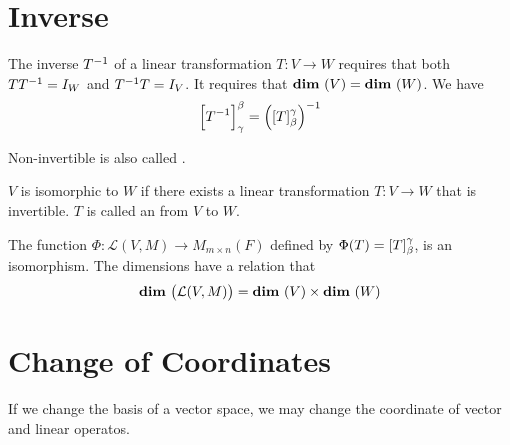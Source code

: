 %
%
%
%


\section{Inverse}
\begin{definition}
    The inverse ${T}^{-1}$ of a linear transformation $T:V \rightarrow W$ requires that both $T {T}^{-1} = I_W$ and ${T}^{-1} T = I_V$. It requires that $\dimension{V} = \dimension{W}$. We have
\begin{equation}
    \coordinate{\inverse{T}}_{\gamma}^{\beta} = \inverse{\mleft( \coordinate{T}_{\beta}^{\gamma} \mright)}
\end{equation}

Non-invertible is also called .
\end{definition}



\begin{definition}
	$V$ is isomorphic to $W$ if there exists a linear transformation $T:V\rightarrow W$ that is invertible. $T$ is called an   from $V$ to $W$.
\end{definition}


\begin{theorem}
	The function $\Phi: \mathcal{L}(V,M) \rightarrow M_{m \times n}(F)$ defined by $\Phi (T) = \coordinate{T}_\beta^\gamma$, is an isomorphism. The dimensions have a relation that 
	\begin{equation}
		\dimension{\mathcal{L}(V,M)} = \dimension{V} \times \dimension{W}
	\end{equation}
\end{theorem}

%
%
%
%

\section{Change of Coordinates}

If we change the basis of a vector space, we may change the coordinate of vector and linear operatos.

